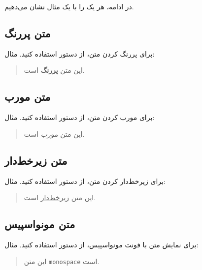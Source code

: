 در ادامه، هر یک را با یک مثال نشان می‌دهیم.

\subsection{متن پررنگ}

برای پررنگ کردن متن، از دستور 
استفاده کنید. مثال:

\begin{quote}
    این متن \textbf{پررنگ} است.
\end{quote}


\subsection{متن مورب}

برای مورب کردن متن، از دستور 
استفاده کنید. مثال:

\begin{quote}
    این متن \textit{مورب} است.
\end{quote}


\subsection{متن زیرخط‌دار}

برای زیرخط‌دار کردن متن، از دستور 
استفاده کنید. مثال:

\begin{quote}
    این متن \underline{زیرخط‌دار} است.
\end{quote}


\subsection{متن مونواسپیس}

برای نمایش متن با فونت مونواسپیس، از دستور
 استفاده کنید. مثال:

\begin{quote}
    این متن \texttt{monospace} است.
\end{quote}


